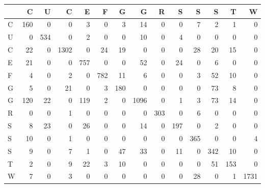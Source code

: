 \begin{tabular}{lrrrrrrrrrrrrr}
\toprule
{} &    C &    U &     C &    E &    F &    G &     G &    R &    S &    S &    S &    T &     W \\
\midrule
C &  160 &    0 &     0 &    3 &    0 &    3 &    14 &    0 &    0 &    7 &    2 &    1 &     0 \\
U &    0 &  534 &     0 &    2 &    0 &    0 &    10 &    0 &    4 &    0 &    0 &    0 &     0 \\
C &   22 &    0 &  1302 &    0 &   24 &   19 &     0 &    0 &    0 &   28 &   20 &   15 &     0 \\
E &   21 &    0 &     0 &  757 &    0 &    0 &    52 &    0 &   24 &    0 &    6 &    0 &     0 \\
F &    4 &    0 &     2 &    0 &  782 &   11 &     6 &    0 &    0 &    3 &   52 &   10 &     0 \\
G &    5 &    0 &    21 &    0 &    3 &  180 &     0 &    0 &    0 &    0 &   73 &    8 &     0 \\
G &  120 &   22 &     0 &  119 &    2 &    0 &  1096 &    0 &    1 &    3 &   73 &   14 &     0 \\
R &    0 &    0 &     1 &    0 &    0 &    0 &     0 &  303 &    0 &    6 &    0 &    0 &     0 \\
S &    8 &   23 &     0 &   26 &    0 &    0 &    14 &    0 &  197 &    0 &    2 &    0 &     0 \\
S &   10 &    0 &     1 &    0 &    0 &    0 &     0 &    0 &    0 &  365 &    0 &    0 &     4 \\
S &    9 &    0 &     7 &    1 &    0 &   47 &    33 &    0 &   11 &    0 &  342 &   10 &     0 \\
T &    2 &    0 &     9 &   22 &    3 &   10 &     0 &    0 &    0 &    0 &   51 &  153 &     0 \\
W &    7 &    0 &     3 &    0 &    0 &    0 &     0 &    0 &    0 &   28 &    0 &    1 &  1731 \\
\bottomrule
\end{tabular}
